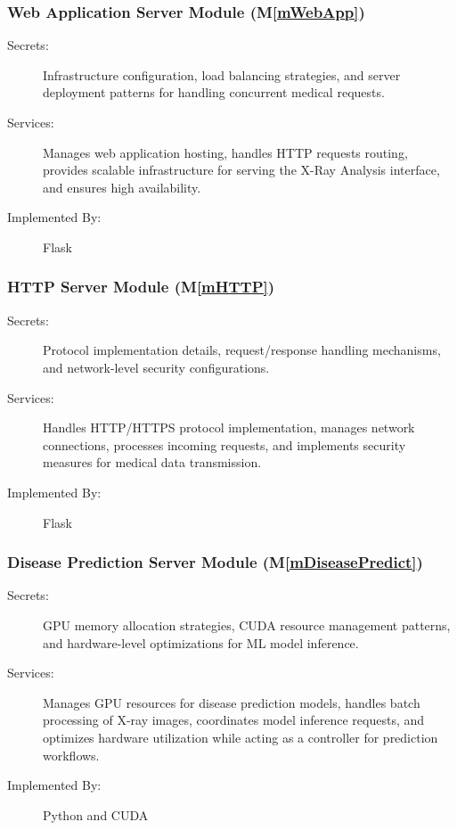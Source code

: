\documentclass[12pt, titlepage]{article}
\newcommand{\mref}[1]{M\ref{#1}}
\begin{document}
\subsubsection{Web Application Server Module (\mref{mWebApp})}
\begin{description}
\item[Secrets:] Infrastructure configuration, load balancing strategies, and server deployment patterns for handling concurrent medical requests.
\item[Services:] Manages web application hosting, handles HTTP requests routing, provides scalable infrastructure for serving the X-Ray Analysis interface, and ensures high availability.
\item[Implemented By:] Flask
\end{description}
\subsubsection{HTTP Server Module (\mref{mHTTP})}
\begin{description}
\item[Secrets:] Protocol implementation details, request/response handling mechanisms, and network-level security configurations.
\item[Services:] Handles HTTP/HTTPS protocol implementation, manages network connections, processes incoming requests, and implements security measures for medical data transmission.
\item[Implemented By:] Flask
\end{description}
\subsubsection{Disease Prediction Server Module (\mref{mDiseasePredict})}
\begin{description}
\item[Secrets:] GPU memory allocation strategies, CUDA resource management patterns, and hardware-level optimizations for ML model inference.
\item[Services:] Manages GPU resources for disease prediction models, handles batch processing of X-ray images, coordinates model inference requests, and optimizes hardware utilization while acting as a controller for prediction workflows.
\item[Implemented By:] Python and CUDA
\end{description}
\end{document}
